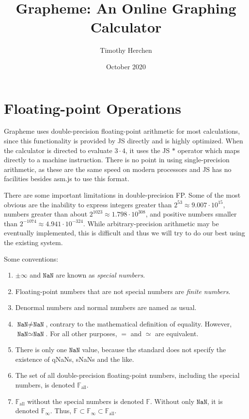 \documentclass{article}
\newcommand{\NaN}{\texttt{NaN}}
\newcommand{\allfp}{\mathbb{F}_\text{all}}
\newcommand{\definedfp}{\mathbb{F}_\infty}
\newcommand{\finitefp}{\mathbb{F}}
\begin{document}
\title{Grapheme: An Online Graphing Calculator}
\author{Timothy Herchen}
\date{October 2020}

\begin{titlepage}
\maketitle
\end{titlepage}

\tableofcontents
\newpage

\section{Floating-point Operations}

Grapheme uses double-precision floating-point arithmetic for most calculations, since this functionality is provided by JS directly and is highly optimized. When the calculator is directed to evaluate $3 \cdot 4$, it uses the JS $*$ operator which maps directly to a machine instruction. There is no point in using single-precision arithmetic, as these are the same speed on modern processors and JS has no facilities besides asm.js to use this format.

There are some important limitations in double-precision FP. Some of the most obvious are the inability to express integers greater than $2^{53}\approx 9.007\cdot 10^{15}$, numbers greater than about $2^{1023}\approx 1.798 \cdot 10^{308}$, and positive numbers smaller than $2^{-1074}\approx 4.941\cdot 10^{-324}$. While arbitrary-precision arithmetic may be eventually implemented, this is difficult and thus we will try to do our best using the existing system.

Some conventions:
\begin{enumerate}
  \item $\pm\infty$ and $\NaN$ are known as \textit{special numbers}.
  \item Floating-point numbers that are not special numbers are \textit{finite numbers}.
  \item Denormal numbers and normal numbers are named as usual.
  \item $\NaN\neq\NaN$, contrary to the mathematical definition of equality. However, $\NaN\simeq\NaN$. For all other purposes, $=$ and $\simeq$ are equivalent.
  \item There is only one $\NaN$ value, because the standard does not specify the existence of qNaNs, sNaNs and the like.
  \item The set of all double-precision floating-point numbers, including the special numbers, is denoted $\allfp$.
  \item $\allfp$ without the special numbers is denoted $\finitefp$. Without only $\NaN$, it is denoted $\definedfp$. Thus, $\finitefp\subset\definedfp\subset\allfp$.
\end{enumerate}
\end{document}
